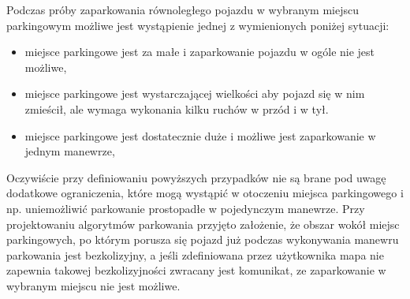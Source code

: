 \documentclass[a4paper,11pt,twoside]{report}
\theoremstyle{definition}
\begin{document}
Podczas próby zaparkowania równoległego pojazdu w wybranym miejscu parkingowym możliwe jest wystąpienie jednej z wymienionych poniżej sytuacji:
\begin{itemize}
	\item miejsce parkingowe jest za małe i zaparkowanie pojazdu w ogóle nie jest możliwe,
	\item miejsce parkingowe jest wystarczającej wielkości aby pojazd się w nim zmieścił, ale wymaga wykonania kilku ruchów w przód i w tył.	
	\item miejsce parkingowe jest dostatecznie duże i możliwe jest zaparkowanie w jednym manewrze,
\end{itemize}

Oczywiście przy definiowaniu powyższych przypadków nie są brane pod uwagę dodatkowe ograniczenia, które mogą wystąpić w otoczeniu miejsca parkingowego i np. uniemożliwić parkowanie prostopadłe w pojedynczym manewrze. Przy projektowaniu algorytmów parkowania przyjęto założenie, że obszar wokół miejsc parkingowych, po którym porusza się pojazd już podczas wykonywania manewru parkowania jest bezkolizyjny, a jeśli zdefiniowana przez użytkownika mapa nie zapewnia takowej bezkolizyjności zwracany jest komunikat, ze zaparkowanie w wybranym miejscu nie jest możliwe. 
\end{document}
